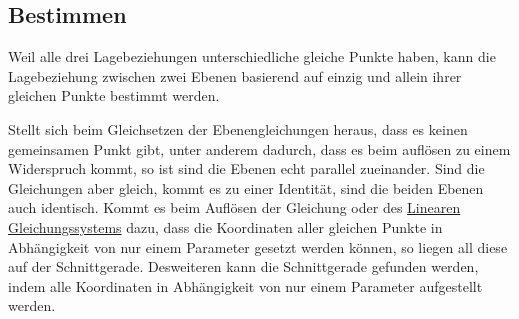 \documentclass{article}
\begin{document}
\subsection{Bestimmen}
Weil alle drei Lagebeziehungen unterschiedliche gleiche Punkte haben, kann die Lagebeziehung zwischen zwei Ebenen basierend auf einzig und allein ihrer gleichen Punkte bestimmt werden.
 
Stellt sich beim Gleichsetzen der Ebenengleichungen heraus, dass es keinen gemeinsamen Punkt gibt, unter anderem dadurch, dass es beim auflösen zu einem Widerspruch kommt, so ist sind die Ebenen echt parallel zueinander. Sind die Gleichungen aber gleich, kommt es zu einer Identität, sind die beiden Ebenen auch identisch. Kommt es beim Auflösen der Gleichung oder des \hyperref[Lineare Gleichungssysteme]{Linearen Gleichungssystems} dazu, dass die Koordinaten aller gleichen Punkte in Abhängigkeit von nur einem Parameter gesetzt werden können, so liegen all diese auf der Schnittgerade. Desweiteren kann die Schnittgerade gefunden werden, indem alle Koordinaten in Abhängigkeit von nur einem Parameter aufgestellt werden. 
 
\end{document}
